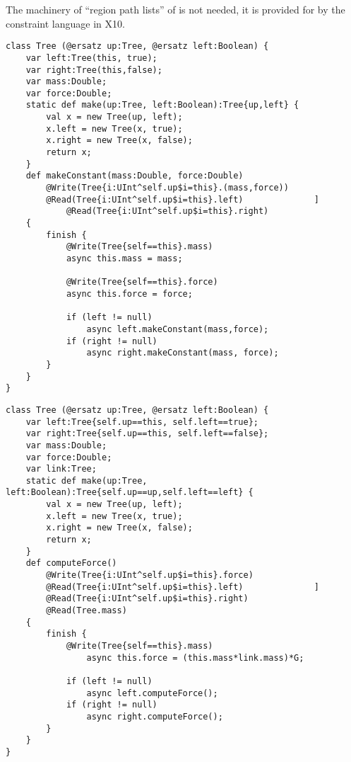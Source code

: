 The machinery of ``region path lists'' of  is not needed, it
is provided for by the constraint language in X10. 

\begin{example}
\begin{lstlisting}
class Tree (@ersatz up:Tree, @ersatz left:Boolean) {
    var left:Tree(this, true);
    var right:Tree(this,false);
    var mass:Double;
    var force:Double;
    static def make(up:Tree, left:Boolean):Tree{up,left} {
        val x = new Tree(up, left);
        x.left = new Tree(x, true);
        x.right = new Tree(x, false);
        return x;
    }
    def makeConstant(mass:Double, force:Double)
        @Write(Tree{i:UInt^self.up$i=this}.(mass,force))
        @Read(Tree{i:UInt^self.up$i=this}.left)              ]
            @Read(Tree{i:UInt^self.up$i=this}.right)
    {
        finish {
            @Write(Tree{self==this}.mass)
            async this.mass = mass;

            @Write(Tree{self==this}.force)
            async this.force = force;            

            if (left != null)
                async left.makeConstant(mass,force);
            if (right != null)
                async right.makeConstant(mass, force);
        }
    }
}
\end{lstlisting}
\end{example}


\begin{example}
\begin{lstlisting}
class Tree (@ersatz up:Tree, @ersatz left:Boolean) {
    var left:Tree{self.up==this, self.left==true};
    var right:Tree{self.up==this, self.left==false};
    var mass:Double;
    var force:Double;
    var link:Tree;
    static def make(up:Tree, left:Boolean):Tree{self.up==up,self.left==left} {
        val x = new Tree(up, left);
        x.left = new Tree(x, true);
        x.right = new Tree(x, false);
        return x;
    }
    def computeForce()
        @Write(Tree{i:UInt^self.up$i=this}.force)
        @Read(Tree{i:UInt^self.up$i=this}.left)              ]
        @Read(Tree{i:UInt^self.up$i=this}.right)
        @Read(Tree.mass)            
    {
        finish {
            @Write(Tree{self==this}.mass)
                async this.force = (this.mass*link.mass)*G;

            if (left != null)
                async left.computeForce();
            if (right != null)
                async right.computeForce();
        }
    }
}
\end{lstlisting}
\end{example}




